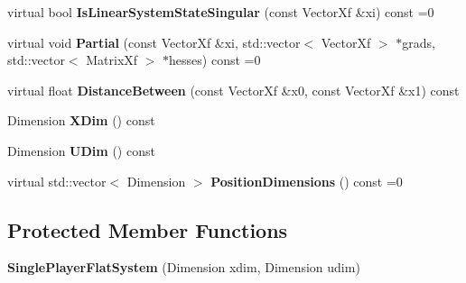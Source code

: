 \begin{DoxyCompactItemize}
\item 
virtual bool {\bfseries Is\+Linear\+System\+State\+Singular} (const Vector\+Xf \&xi) const =0\hypertarget{classilqgames_1_1_single_player_flat_system_a7c4f5712a49f29f7e2e5b0bebc645f87}{}\label{classilqgames_1_1_single_player_flat_system_a7c4f5712a49f29f7e2e5b0bebc645f87}

\item 
virtual void {\bfseries Partial} (const Vector\+Xf \&xi, std\+::vector$<$ Vector\+Xf $>$ $\ast$grads, std\+::vector$<$ Matrix\+Xf $>$ $\ast$hesses) const =0\hypertarget{classilqgames_1_1_single_player_flat_system_ac13f3f047b18f757fa0237b79024c22a}{}\label{classilqgames_1_1_single_player_flat_system_ac13f3f047b18f757fa0237b79024c22a}

\item 
virtual float {\bfseries Distance\+Between} (const Vector\+Xf \&x0, const Vector\+Xf \&x1) const \hypertarget{classilqgames_1_1_single_player_flat_system_a887a8c265b40218d02efaf876e6a8843}{}\label{classilqgames_1_1_single_player_flat_system_a887a8c265b40218d02efaf876e6a8843}

\item 
Dimension {\bfseries X\+Dim} () const \hypertarget{classilqgames_1_1_single_player_flat_system_ada9537087ddb5460fed6eff12e6b280b}{}\label{classilqgames_1_1_single_player_flat_system_ada9537087ddb5460fed6eff12e6b280b}

\item 
Dimension {\bfseries U\+Dim} () const \hypertarget{classilqgames_1_1_single_player_flat_system_a47c268e369f91c0b9609af7949c085bb}{}\label{classilqgames_1_1_single_player_flat_system_a47c268e369f91c0b9609af7949c085bb}

\item 
virtual std\+::vector$<$ Dimension $>$ {\bfseries Position\+Dimensions} () const =0\hypertarget{classilqgames_1_1_single_player_flat_system_aab04053f573b24de4332b7e3d6325ec1}{}\label{classilqgames_1_1_single_player_flat_system_aab04053f573b24de4332b7e3d6325ec1}

\end{DoxyCompactItemize}
\subsection*{Protected Member Functions}
\begin{DoxyCompactItemize}
\item 
{\bfseries Single\+Player\+Flat\+System} (Dimension xdim, Dimension udim)\hypertarget{classilqgames_1_1_single_player_flat_system_a4ab18a6147857ce85583ea41c1959a54}{}\label{classilqgames_1_1_single_player_flat_system_a4ab18a6147857ce85583ea41c1959a54}

\end{DoxyCompactItemize}
